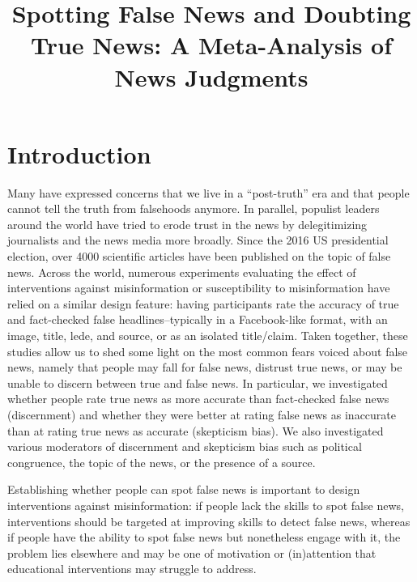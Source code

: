 \documentclass[
  doc,floatsintext]{apa6}
\title{Spotting False News and Doubting True News: A Meta-Analysis of News Judgments}
\author{\textsuperscript{}}
\date{}
\affiliation{\vspace{0.5cm}\textsuperscript{} }
\begin{document}
\maketitle

\clearpage

\section{Introduction}\label{introduction}

Many have expressed concerns that we live in a ``post-truth'' era and that people cannot tell the truth from falsehoods anymore. In parallel, populist leaders around the world have tried to erode trust in the news by delegitimizing journalists and the news media more broadly. Since the 2016 US presidential election, over 4000 scientific articles have been published on the topic of false news. Across the world, numerous experiments evaluating the effect of interventions against misinformation or susceptibility to misinformation have relied on a similar design feature: having participants rate the accuracy of true and fact-checked false headlines--typically in a Facebook-like format, with an image, title, lede, and source, or as an isolated title/claim. Taken together, these studies allow us to shed some light on the most common fears voiced about false news, namely that people may fall for false news, distrust true news, or may be unable to discern between true and false news. In particular, we investigated whether people rate true news as more accurate than fact-checked false news (discernment) and whether they were better at rating false news as inaccurate than at rating true news as accurate (skepticism bias). We also investigated various moderators of discernment and skepticism bias such as political congruence, the topic of the news, or the presence of a source.

Establishing whether people can spot false news is important to design interventions against misinformation: if people lack the skills to spot false news, interventions should be targeted at improving skills to detect false news, whereas if people have the ability to spot false news but nonetheless engage with it, the problem lies elsewhere and may be one of motivation or (in)attention that educational interventions may struggle to address.
\end{document}
